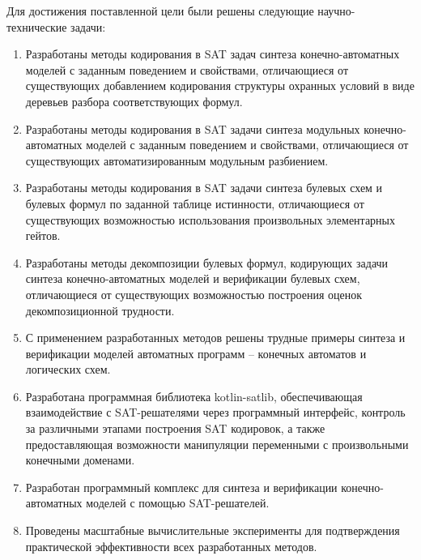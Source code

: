 \tasks
%
Для достижения поставленной цели были решены следующие научно-технические задачи:
\begin{enumerate}[beginpenalty=10000]
    \item Разработаны методы кодирования в SAT задач синтеза конечно-автоматных моделей с заданным поведением и свойствами, отличающиеся от существующих добавлением кодирования структуры охранных условий в виде деревьев разбора соответствующих формул.
    \item Разработаны методы кодирования в SAT задачи синтеза модульных конечно-автоматных моделей с заданным поведением и свойствами, отличающиеся от существующих автоматизированным модульным разбиением.
    \item Разработаны методы кодирования в SAT задачи синтеза булевых схем и булевых формул по заданной таблице истинности, отличающиеся от существующих возможностью использования произвольных элементарных гейтов.
    \item Разработаны методы декомпозиции булевых формул, кодирующих задачи синтеза конечно-автоматных моделей и верификации булевых схем, отличающиеся от существующих возможностью построения оценок декомпозиционной трудности.
    \item С применением разработанных методов решены трудные примеры синтеза и верификации моделей автоматных программ \--- конечных автоматов и логических схем.
    \item Разработана программная библиотека kotlin-satlib, обеспечивающая взаимодействие с SAT-решателями через программный интерфейс, контроль за различными этапами построения SAT кодировок, а также предоставляющая возможности манипуляции переменными с произвольными конечными доменами.
    \item Разработан программный комплекс  для синтеза и верификации конечно-автоматных моделей с помощью SAT-решателей.
    \item Проведены масштабные вычислительные эксперименты для подтверждения практической эффективности всех разработанных методов.
\end{enumerate}


